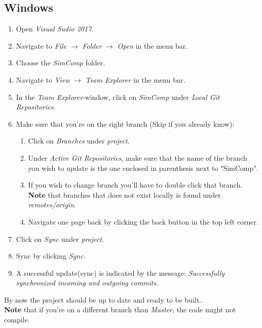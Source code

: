 \subsection{Windows}
\begin{enumerate}
    \item Open \textit{Visual Sudio 2017}.
    \item Navigate to \textit{File} \(\rightarrow\) \textit{Folder} \(\rightarrow\) \textit{Open} in the menu bar.
    \item Choose the \textit{SimComp} folder.
    \item Navigate to \textit{View} \(\rightarrow\) \textit{Team Explorer} in the menu bar.
    \item In the \textit{Team Explorer}-window, click on \textit{SimComp} under \textit{Local Git Repositories}.
    \item Make sure that you're on the right branch (Skip if you already know):
        \begin{enumerate}
            \item Click on \textit{Branches} under \textit{project}.
            \item Under \textit{Active Git Repositories}, make sure that the name of the branch you wish to update is the one enclosed in parenthesis next to "SimComp".
            \item If you wish to change branch you'll have to double click that branch. \textbf{Note} that branches that does not exist locally is found under \textit{remotes/origin}.
            \item Navigate one page back by clicking the back button in the top left corner. 
        \end{enumerate}
    \item Click on \textit{Sync} under \textit{project}.
    \item Sync by clicking \textit{Sync}.
    \item A successful update(sync) is indicated by the message: \textit{Successfully synchronized incoming and outgoing commits.}
\end{enumerate}

By now the project should be up to date and ready to be built.\\
\textbf{Note} that if you're on a different branch than \textit{Master}, the code might not compile.